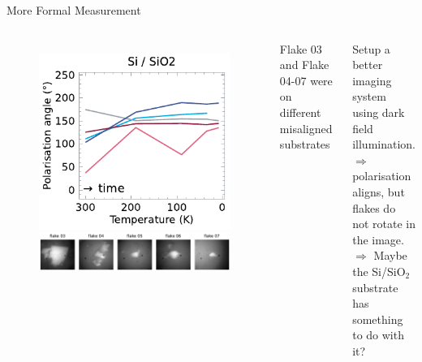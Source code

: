 \documentclass[
	10pt,
]{beamer}
\begin{document}
\begin{frame}{More Formal Measurement}
	\begin{columns}
		\begin{figure}
			\centering
			\includegraphics[width=.8\textwidth]{../figures/2024-01-23 rotating pl.pdf}
			\includegraphics[width=\textwidth]{../figures/2024-01-23 flakes.pdf}\\
		\end{figure}
		\vfill
		\small
		Flake 03 and Flake 04-07 were on different misaligned substrates

		Setup a better imaging system using dark field illumination.
		\vspace{.5cm}\\
		{\color{seeblau}$\Rightarrow$} polarisation aligns, but flakes do not rotate in the image.
		\vspace{.5cm}\\
		{\color{seeblau}$\Rightarrow$} Maybe the Si/SiO$_2$ substrate has something to do with it?
	\end{columns}
\end{frame}
\end{document}
